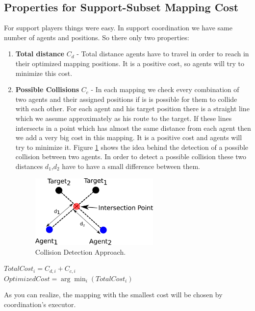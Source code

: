 \subsection{Properties for Support-Subset Mapping Cost}
For support players things were easy. In support coordination we have same number of agents and positions. So there only two properties:  
\begin{enumerate}
\item \textbf{Total distance }$C_{d}$ - Total distance agents have to travel in order to reach in their optimized mapping positions. It is a positive cost, so agents will try to minimize this cost.
\item \textbf{Possible Collisions }$C_{c}$ - In each mapping we check every combination of two agents and their assigned positions if is is possible for them to collide with each other. For each agent and his target position there is a straight line which we assume approximately as his route to the target. If these lines intersects in a point which has almost the same distance from each agent then we add a very big cost in this mapping. It is a positive cost and agents will try to minimize it. Figure \ref{fig:AvoidCollision} shows the idea behind the detection of a possible collision between two agents. In order to detect a possible collision these two distances $d_{1}$,$d_{2}$ have to have a small difference between them.
\begin{figure}[htb!]
\centering
  \includegraphics[width=0.6\textwidth]{Chapter4/figures/AvoidCollision.pdf}
  \caption{Collision Detection Approach.} 
  \label{fig:AvoidCollision}
\end{figure}
\end{enumerate}
\begin{center}
$TotalCost_{i} = C_{d,i}+C_{c,i}$\\
$Optimized Cost = \arg\min_{i}(TotalCost_{i})$
\end{center}
As you can realize, the mapping with the smallest cost will be chosen by coordination's executor.

